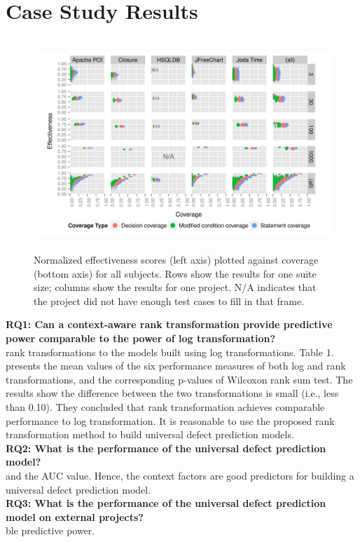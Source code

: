 \section{Case Study Results}
\begin{figure}
\vspace{10pt}
\includegraphics[width=\textwidth,height=8cm]{Figures/Coverage_result.JPG}
\caption{Normalized effectiveness scores (left axis) plotted against coverage (bottom axis) for all subjects. Rows show the results for one suite size; columns show the results for one project. N/A indicates that the project did not have enough test cases to fill in that frame.}
\label{f1}
\end{figure}

\textbf{RQ1: Can a context-aware rank transformation provide predictive power comparable to the power of log transformation?}\\
rank transformations to the models built using log transformations. Table 1. presents the mean values of the six performance measures of both log and rank transformations, and the corresponding p-values of Wilcoxon rank sum test. The
results show the difference between the two transformations is small (i.e., less than 0.10). They concluded that rank transformation achieves comparable performance to log transformation. It is reasonable to use the proposed rank transformation method to build universal defect prediction models.\\
\textbf{RQ2: What is the performance of the universal defect
prediction model?}\\
and the AUC value. Hence, the context factors are good predictors for building a universal defect prediction model.\\
\textbf{RQ3: What is the performance of the universal defect prediction model on external projects?}\\
ble predictive power.



